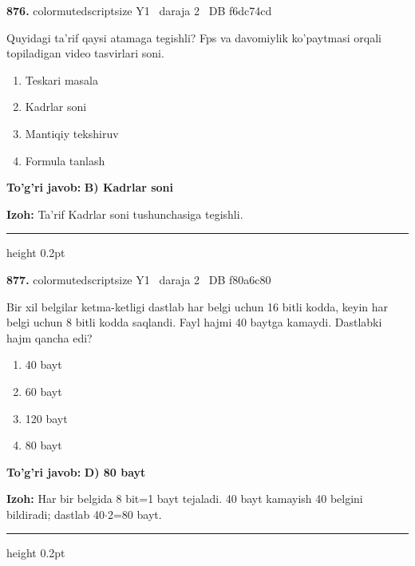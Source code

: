\documentclass[10pt,a4paper,oneside]{article}
\begin{document}
\noindent\textbf{\color{ink}876.}  {color{muted}scriptsize Y1 \textbullet\ daraja 2 \textbullet\ DB f6dc74cd}
\par
Quyidagi ta'rif qaysi atamaga tegishli? Fps va davomiylik ko'paytmasi orqali topiladigan video tasvirlari soni.
\begin{enumerate}[label=\Alph*),leftmargin=9mm]
\item Teskari masala
\item Kadrlar soni
\item Mantiqiy tekshiruv
\item Formula tanlash
\end{enumerate}
\begin{tcolorbox}[enhanced,breakable,colback=teal!4,colframe=teal!50!black,boxrule=0.5pt,arc=1.1mm,left=3mm,right=3mm,top=1.7mm,bottom=1.7mm,before skip=2mm,after skip=2mm]
\textbf{\color{teal}To'g'ri javob:} \textbf{B) Kadrlar soni}
\par\smallskip
\textbf{Izoh:} Ta'rif Kadrlar soni tushunchasiga tegishli.
\end{tcolorbox}
\vspace{2mm}\hrule height 0.2pt \vspace{3mm}

\noindent\textbf{\color{ink}877.}  {color{muted}scriptsize Y1 \textbullet\ daraja 2 \textbullet\ DB f80a6c80}
\par
Bir xil belgilar ketma-ketligi dastlab har belgi uchun 16 bitli kodda, keyin har belgi uchun 8 bitli kodda saqlandi. Fayl hajmi 40 baytga kamaydi. Dastlabki hajm qancha edi?
\begin{enumerate}[label=\Alph*),leftmargin=9mm]
\item 40 bayt
\item 60 bayt
\item 120 bayt
\item 80 bayt
\end{enumerate}
\begin{tcolorbox}[enhanced,breakable,colback=teal!4,colframe=teal!50!black,boxrule=0.5pt,arc=1.1mm,left=3mm,right=3mm,top=1.7mm,bottom=1.7mm,before skip=2mm,after skip=2mm]
\textbf{\color{teal}To'g'ri javob:} \textbf{D) 80 bayt}
\par\smallskip
\textbf{Izoh:} Har bir belgida 8 bit=1 bayt tejaladi. 40 bayt kamayish 40 belgini bildiradi; dastlab 40\ensuremath{\cdot}2=80 bayt.
\end{tcolorbox}
\vspace{2mm}\hrule height 0.2pt \vspace{3mm}
\end{document}
